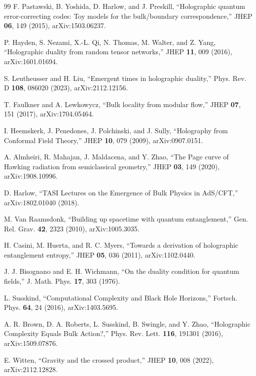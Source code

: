 \documentclass[12pt,a4paper]{article}
\begin{document}
\begin{thebibliography}{99}
F. Pastawski, B. Yoshida, D. Harlow, and J. Preskill, ``Holographic quantum error-correcting codes: Toy models for the bulk/boundary correspondence,'' JHEP \textbf{06}, 149 (2015), arXiv:1503.06237.

P. Hayden, S. Nezami, X.-L. Qi, N. Thomas, M. Walter, and Z. Yang, ``Holographic duality from random tensor networks,'' JHEP \textbf{11}, 009 (2016), arXiv:1601.01694.

S. Leutheusser and H. Liu, ``Emergent times in holographic duality,'' Phys. Rev. D \textbf{108}, 086020 (2023), arXiv:2112.12156.

T. Faulkner and A. Lewkowycz, ``Bulk locality from modular flow,'' JHEP \textbf{07}, 151 (2017), arXiv:1704.05464.

I. Heemskerk, J. Penedones, J. Polchinski, and J. Sully, ``Holography from Conformal Field Theory,'' JHEP \textbf{10}, 079 (2009), arXiv:0907.0151.

A. Almheiri, R. Mahajan, J. Maldacena, and Y. Zhao, ``The Page curve of Hawking radiation from semiclassical geometry,'' JHEP \textbf{03}, 149 (2020), arXiv:1908.10996.

D. Harlow, ``TASI Lectures on the Emergence of Bulk Physics in AdS/CFT,'' arXiv:1802.01040 (2018).

M. Van Raamsdonk, ``Building up spacetime with quantum entanglement,'' Gen. Rel. Grav. \textbf{42}, 2323 (2010), arXiv:1005.3035.

H. Casini, M. Huerta, and R. C. Myers, ``Towards a derivation of holographic entanglement entropy,'' JHEP \textbf{05}, 036 (2011), arXiv:1102.0440.

J. J. Bisognano and E. H. Wichmann, ``On the duality condition for quantum fields,'' J. Math. Phys. \textbf{17}, 303 (1976).

L. Susskind, ``Computational Complexity and Black Hole Horizons,'' Fortsch. Phys. \textbf{64}, 24 (2016), arXiv:1403.5695.

A. R. Brown, D. A. Roberts, L. Susskind, B. Swingle, and Y. Zhao, ``Holographic Complexity Equals Bulk Action?,'' Phys. Rev. Lett. \textbf{116}, 191301 (2016), arXiv:1509.07876.

E. Witten, ``Gravity and the crossed product,'' JHEP \textbf{10}, 008 (2022), arXiv:2112.12828.


\end{thebibliography}
\end{document}

